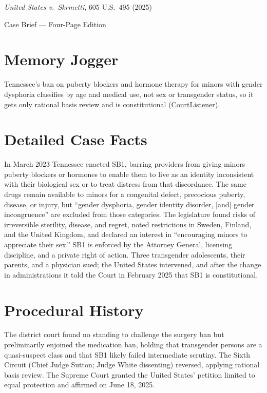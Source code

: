 \documentclass[12pt]{article}
\begin{document}
\begin{center}
{\LARGE \textit{United States v.\ Skrmetti}, 605 U.S.\ 495 (2025)\par}
\vspace{0.8em}
{\large Case Brief --- Four-Page Edition\par}
\end{center}
\vspace{1em}

\section{Memory Jogger}

Tennessee's ban on puberty blockers and hormone therapy for minors with gender dysphoria classifies by age and medical use, not sex or transgender status, so it gets only rational basis review and is constitutional (\href{https://www.courtlistener.com/opinion/10776831/united-states-v-skrmetti/}{CourtListener}).

\section{Detailed Case Facts}

In March 2023 Tennessee enacted SB1, barring providers from giving minors puberty blockers or hormones to enable them to live as an identity inconsistent with their biological sex or to treat distress from that discordance. The same drugs remain available to minors for a congenital defect, precocious puberty, disease, or injury, but ``gender dysphoria, gender identity disorder, [and] gender incongruence'' are excluded from those categories. The legislature found risks of irreversible sterility, disease, and regret, noted restrictions in Sweden, Finland, and the United Kingdom, and declared an interest in ``encouraging minors to appreciate their sex.'' SB1 is enforced by the Attorney General, licensing discipline, and a private right of action. Three transgender adolescents, their parents, and a physician sued; the United States intervened, and after the change in administrations it told the Court in February 2025 that SB1 is constitutional.

\section{Procedural History}

The district court found no standing to challenge the surgery ban but preliminarily enjoined the medication ban, holding that transgender persons are a quasi-suspect class and that SB1 likely failed intermediate scrutiny. The Sixth Circuit (Chief Judge Sutton; Judge White dissenting) reversed, applying rational basis review. The Supreme Court granted the United States' petition limited to equal protection and affirmed on June 18, 2025.
\end{document}
